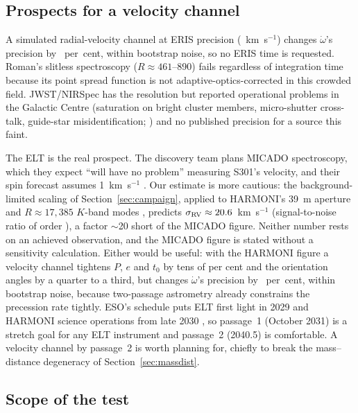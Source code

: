 \documentclass{aastex701}
\begin{document}
\subsection{Prospects for a velocity channel}
\label{sec:rv}

A simulated radial-velocity channel at ERIS precision (\rvtestErisRvSigma{}~km~s$^{-1}$) changes $\dot\omega$'s precision by \rvtestErisPctChangeOmegaDot{}~per~cent, within bootstrap noise, so no ERIS time is requested. Roman's slitless spectroscopy ($R\approx461$--890) fails regardless of integration time because its point spread function is not adaptive-optics-corrected in this crowded field. JWST/NIRSpec has the resolution \citep{shajib2025} but reported operational problems in the Galactic Centre (saturation on bright cluster members, micro-shutter cross-talk, guide-star misidentification; \citealt{yusefzadeh2025}) and no published precision for a source this faint.

The ELT is the real prospect. The discovery team plans MICADO spectroscopy, which they expect ``will have no problem'' measuring S301's velocity, and their spin forecast assumes 1~km~s$^{-1}$ \citep{gravity2026}. Our estimate is more cautious: the background-limited scaling of Section~\ref{sec:campaign}, applied to HARMONI's 39~m aperture and $R\approx17{,}385$ $K$-band modes \citep{harmoni2024}, predicts $\sigma_{\rm RV}\approx20.6{}$~km~s$^{-1}$ (signal-to-noise ratio of order \rvtestHarmoniSnr{}), a factor $\sim$20 short of the MICADO figure. Neither number rests on an achieved observation, and the MICADO figure is stated without a sensitivity calculation. Either would be useful: with the HARMONI figure a velocity channel tightens $P$, $e$ and $t_0$ by tens of per cent and the orientation angles by a quarter to a third, but changes $\dot\omega$'s precision by \rvtestHarmoniPctChangeOmegaDot{}~per~cent, within bootstrap noise, because two-passage astrometry already constrains the precession rate tightly. ESO's schedule puts ELT first light in 2029 and HARMONI science operations from late 2030 \citep{eso2026}, so passage~1 (October 2031) is a stretch goal for any ELT instrument and passage~2 (2040.5) is comfortable. A velocity channel by passage~2 is worth planning for, chiefly to break the mass--distance degeneracy of Section~\ref{sec:massdist}.

\subsection{Scope of the test}
\label{sec:scope}
\end{document}
